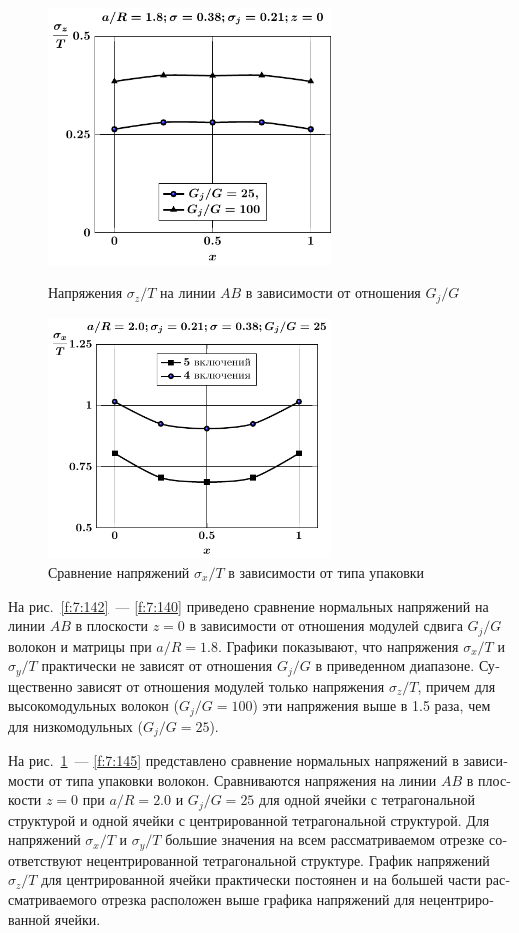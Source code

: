 \begin{russian}
\begin{figure}[h!]
\centering\footnotesize
\parbox[b]{7.5cm}{\centering\includegraphics[width=7.5cm]{inc5-g-a18-sig_z.pdf}
\caption{Напряжения $\sigma_z/T$ на линии $AB$ в зависимости от отношения $G_j/G$
\label{f:7:140}}}\hfil\hfil
\parbox[b]{7.5cm}{\centering\includegraphics[width=7.5cm]{inc5-4-a20-g25-z0-sig_x.pdf}
\caption{Сравнение напряжений $\sigma_x/T$ в зависимости от типа упаковки
\label{f:7:141}}}
\end{figure}

На рис.~\ref{f:7:142}~--- \ref{f:7:140} приведено сравнение нормальных напряжений на линии $AB$ в плоскости $z=0$ в зависимости от отношения модулей сдвига $G_j/G$ волокон и матрицы при $a/R=1.8$. Графики показывают, что напряжения $\sigma_x/T$ и $\sigma_y/T$ практически не зависят от отношения $G_j/G$ в приведенном диапазоне. Существенно зависят от отношения модулей только напряжения $\sigma_z/T$, причем для высокомодульных волокон ($G_j/G=100$) эти напряжения выше в 1.5 раза, чем для низкомодульных ($G_j/G=25$).

На рис.~\ref{f:7:141}~--- \ref{f:7:145} представлено сравнение нормальных напряжений в зависимости от типа упаковки волокон. Сравниваются напряжения на линии $AB$ в плоскости $z=0$ при $a/R=2.0$ и $G_j/G=25$ для одной ячейки с тетрагональной структурой и одной ячейки с центрированной тетрагональной структурой. Для напряжений $\sigma_x/T$ и $\sigma_y/T$ большие значения на всем рассматриваемом отрезке соответствуют нецентрированной тетрагональной структуре. График напряжений $\sigma_z/T$ для центрированной ячейки практически постоянен и на большей части рассматриваемого отрезка расположен выше графика напряжений для нецентрированной ячейки.


\end{russian}
